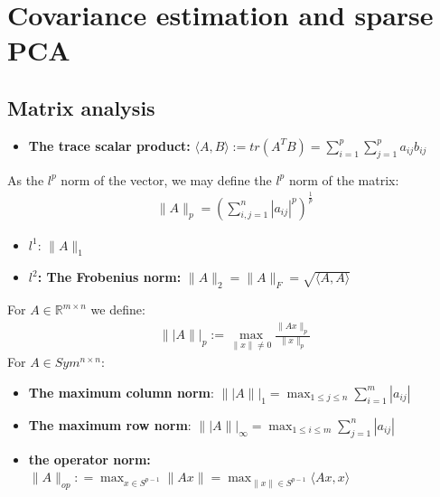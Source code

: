 \newpage
\section{Covariance estimation and sparse PCA}
\subsection*{Matrix analysis}
\begin{itemize}
	\item \textbf{The trace scalar product:} $\langle A, B \rangle := tr(A^T B) = \sum_{i = 1}^p \sum_{j = 1}^p a_{ij} b_{ij}$
\end{itemize}

\begin{definition}
	As the $l^p$ norm of the vector, we may define the $l^p$ norm of the matrix:
	\begin{align*}
		\|A\|_p = (\sum_{i, j = 1}^n |a_{ij}|^p)^{\frac{1}{p}}
	\end{align*}
\end{definition}
\begin{example}\quad
\begin{itemize}
	\item $l^1$: $\|A\|_1$
	\item \textbf{$l^2$: The Frobenius norm:} $\|A\|_2 = \|A\|_F = \sqrt{\langle A, A \rangle}$
\end{itemize}	
\end{example}

\begin{proposition}
\end{proposition}


\begin{definition}
	For $A \in \mathbb{R}^{m \times n}$ we define:
	\begin{align*}
		\||A\||_p := \max_{\|x\| \neq 0} \frac{\|Ax\|_p}{\|x\|_p}
	\end{align*}
	For $A \in Sym^{n \times n}$:
 
\end{definition}
\begin{example}\quad
\begin{itemize}
	\item \textbf{The maximum column norm}: $\||A\||_1 = \max_{1 \le j \le n } \sum_{i = 1}^m  |a_{ij}|$
	\item \textbf{The maximum row norm}: $\||A\||_\infty = \max_{1 \le i \le m} \sum_{j =1}^n |a_{ij}|$
	\item \textbf{the operator norm:} $\|A\|_{op}: = \max_{x \in S^{p-1}} \|Ax\|= \max_{\|x\|\in S^{p-1} }\langle A x, x\rangle$
\end{itemize}	
\end{example}






